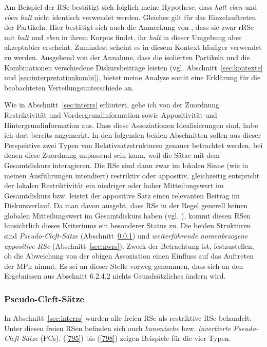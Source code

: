 Am Beispiel der RSe bestätigt sich folglich meine Hypothese, dass \textit{halt eben} und \textit{eben halt} nicht identisch verwendet werden. Gleiches gilt für das Einzelauftre\-ten der Partikeln. Hier bestätigt sich auch die Anmerkung von \citet[80, Fn 104]{Thurmair1989}, dass sie zwar rRSe mit \textit{halt} und \textit{eben} in ihrem Korpus findet, ihr \textit{halt} in dieser Umgebung aber akzeptabler erscheint. Zumindest scheint es in diesem Kontext häufiger verwendet zu werden. Ausgehend von der Annahme, dass die isolierten Partikeln und die Kombinationen verschiedene Diskursbeiträge leisten (vgl. Abschnitt~\ref{sec:kontexte} und \ref{sec:interpretationkombi}), bietet meine Analyse somit eine Erklärung für die beobachteten Verteilungsunterschiede an. 

Wie in Abschnitt~\ref{sec:interrs} erläutert, gehe ich von der Zuordnung Restriktivität und Vordergrundinformation sowie Appositivität und Hintergrundinformation aus. Dass diese Assoziationen Idealisierungen sind, habe ich dort bereits angemerkt. In den folgenden beiden Abschnitten sollen aus dieser Perspektive zwei Typen von Relativsatzstrukturen genauer betrachtet werden, bei denen diese Zuordnung unpassend sein kann, weil die Sätze mit dem Gesamtdiskurs interagieren. Die RSe sind dann zwar im lokalen Sinne (wie in meinen Ausführungen intendiert) restriktiv oder appositiv, gleichzeitig entspricht der lokalen Restriktivität ein niedriger oder hoher Mitteilungswert im Gesamtdiskurs bzw. leistet der appositive Satz einen relevanten Beitrag im Diskursverlauf. Da man davon ausgeht, dass RSe in der Regel generell keinen globalen Mitteilungswert im Gesamtdiskurs haben (vgl. \citealt[38-42]{Antomo2015}), kommt diesen RSen hinsichtlich dieses Kriteriums ein besonderer Status zu. Die beiden Strukturen sind  \textit{Pseudo-Cleft-Sätze} (Abschnitt~\ref{sec:pcs}) und \textit{weiterführende nomenbezogene appositive RSe}  (Abschnitt~\ref{sec:nwrs}). Zweck der Betrachtung ist, festzustellen, ob die Abweichung von der obigen Assoziation einen Einfluss auf das Auftreten der MPn nimmt. Es sei an dieser Stelle vorweg genommen, dass sich an den Ergebnissen aus Abschnitt 6.2.4.2 nichts Grundsätzliches ändern wird.

\subsubsection{Pseudo-Cleft-Sätze}
\label{sec:pcs}
In Abschnitt~\ref{sec:interrs} wurden alle freien RSe  als restriktive RSe behandelt. Unter diesen freien RSen befinden sich auch \textit{kanonische}  bzw. \textit{invertierte Pseudo-Cleft-Sätze}  (PCs). (\ref{795}) bis (\ref{798}) zeigen Beispiele für die vier Typen.

